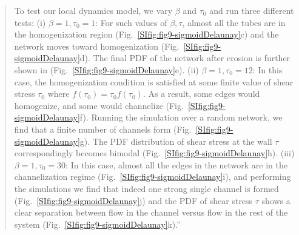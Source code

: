 \documentclass{article}
\begin{document}
{\begin{quote}
    To test our local dynamics model, we vary $\beta$ and $\tau_0$ and run three different tests: (i) $\beta=1,\tau_0=1$: For such values of $\beta,\tau$, almost all the tubes are in the homogenization region (Fig.~\ref{SIfig:fig9-sigmoidDelaunay}c) and the network moves toward homogenization (Fig.~\ref{SIfig:fig9-sigmoidDelaunay}d). The final PDF of the network after erosion is further shown in (Fig.~\ref{SIfig:fig9-sigmoidDelaunay}e). (ii) $\beta=1, \tau_0=12$: In this case, the homogenization condition is satisfied at some finite value of shear stress $\tau_0$ where $f(\tau_0) = \tau_0 f(\tau_0)$. As a result, some edges would homogenize, and some would channelize (Fig.~\ref{SIfig:fig9-sigmoidDelaunay}f). Running the simulation over a random network, we find that a finite number of channels form (Fig.~\ref{SIfig:fig9-sigmoidDelaunay}g). The PDF distribution of shear stress at the wall $\tau$ correspondingly becomes bimodal (Fig.~\ref{SIfig:fig9-sigmoidDelaunay}h). (iii) $\beta=1, \tau_0=30$: In this case, almost all the edges in the network are in the channelization regime  (Fig.~\ref{SIfig:fig9-sigmoidDelaunay}i), and performing the simulations we find that indeed one strong single channel is formed (Fig.~\ref{SIfig:fig9-sigmoidDelaunay}j) and the PDF of shear stress $\tau$ shows a clear separation between flow in the channel versus flow in the rest of the system (Fig.~\ref{SIfig:fig9-sigmoidDelaunay}k).''
\end{quote}
}
\end{document}
